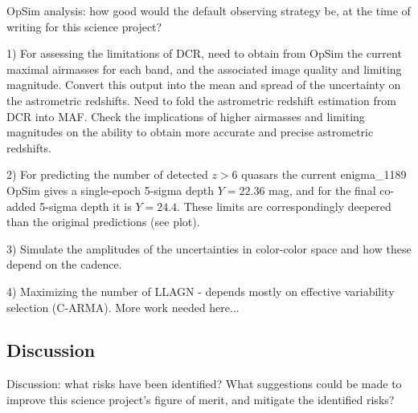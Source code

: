 OpSim analysis: how good would the default observing strategy be, at
the time of writing for this science project?

1) For assessing the limitations of DCR, need to obtain from OpSim
the current maximal airmasses for each band, and the associated
image quality and limiting magnitude. Convert this output into
the mean and spread of the uncertainty on the astrometric redshifts.
Need to fold the astrometric redshift estimation from DCR into MAF.
Check the implications of higher airmasses and limiting magnitudes
on the ability to obtain more accurate and precise astrometric redshifts.

2) For predicting the number of detected $z>6$ quasars
the current enigma\_1189 OpSim gives a single-epoch 5-sigma depth
$Y=22.36$ mag, and for the final co-added 5-sigma depth it is $Y=24.4$.
These limits are correspondingly deepered than the original predictions
(see plot).


3) Simulate the amplitudes of the uncertainties in color-color space and how
these depend on the cadence.

4) Maximizing the number of LLAGN - depends mostly on effective variability selection
(C-ARMA). More work needed here...


\subsection{Discussion}
\label{sec:\secname:discussion}

Discussion: what risks have been identified? What suggestions could be
made to improve this science project's figure of merit, and mitigate
the identified risks?



\navigationbar
